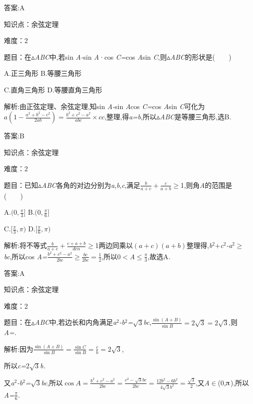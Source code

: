 \documentclass{article} %
\begin{document}
 答案:A

知识点：余弦定理

难度：2

 题目：在$\mathrm{\vartriangle}$\textit{ABC}中,若sin \textit{A-}sin \textit{A}·cos \textit{C=}cos \textit{A}sin \textit{C},则$\mathrm{\vartriangle}$\textit{ABC}的形状是(\textit{　　})

 A.正三角形 B.等腰三角形

 C.直角三角形 D.等腰直角三角形

 解析:由正弦定理、余弦定理,知sin \textit{A-}sin \textit{A}cos \textit{C=}cos \textit{A}sin \textit{C}可化为$a(1-\frac{a^2+b^2-c^2}{2ab})=\frac{b^2+c^2-a^2}{abc}\times c c$,整理,得\textit{a=b},所以$\mathrm{\vartriangle}$\textit{ABC}是等腰三角形,选B\textit{.}

 答案:B

知识点：余弦定理

难度：2

 题目：已知$\mathrm{\vartriangle}$\textit{ABC}各角的对边分别为\textit{a},\textit{b},\textit{c},满足$\frac{b}{a+c}+\frac{c}{a+b}$$\mathrm{\ge}$1,则角\textit{A}的范围是(\textit{　　})

 A.$( 0,\frac{\pi}{3} \rbrack$ B.$(0,\frac{\pi}{6}\rbrack$

 C.$\lbrack \frac{\pi}{3},\pi)$ D.$\lbrack \frac{\pi}{6},\pi)$

 解析:将不等式$\frac{b}{a+c}+\frac{c+a+b}{den}$$\mathrm{\ge}$1两边同乘以$(a+c)(a+b)$整理得,\textit{b}${}^{2}$\textit{$+$c}${}^{2}$\textit{-a}${}^{2}$$\mathrm{\ge}$\textit{bc},所以cos \textit{A=}$\frac{b^2+c^2-a^2}{2bc}\ge \frac{bc}{2bc}=\frac{1}{2}$,所以0\textit{$<$A}$\mathrm{\le}$$\frac{\pi}{3}$,故选A\textit{.}

 答案:A

知识点：余弦定理

难度：2


 题目：在$\mathrm{\vartriangle}$\textit{ABC}中,若边长和内角满足\textit{a}${}^{2}$\textit{-b}${}^{2}$\textit{=}$\sqrt{3}$\textit{bc},$\frac{\sin (A+B)}{\sin B}=2\sqrt{3}=2\sqrt{3}$,则\textit{A=\underbar{　　　　　}.~}

 解析:因为$\frac{\sin (A+B)}{\sin B}=\frac{\sin C}{\sin B}=\frac{c}{b}=2\sqrt{3}$,

所以\textit{c=}2$\sqrt{3}$\textit{b.}

又\textit{a}${}^{2}$\textit{-b}${}^{2}$\textit{=}$\sqrt{3}$\textit{bc},所以$\cos A=\frac{b^2+c^2-a^2}{2bc}=\frac{c^2-\sqrt{3}bc}{2bc}=\frac{12b^2-6b^2}{4\sqrt{3}b^2}=\frac{\sqrt{3}}{2}$,又\textit{A}$\mathrm{\in}$(0,$\piup$),所以\textit{A=}$\frac{\pi}{6}$\textit{.}
\end{document}
